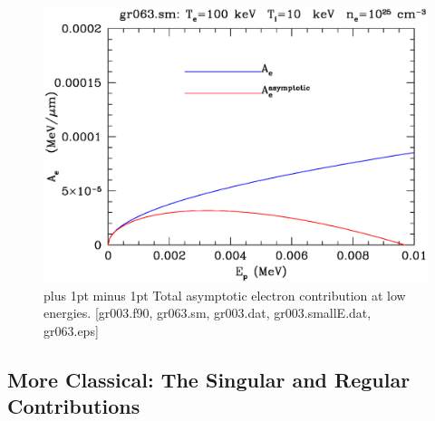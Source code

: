 \documentclass[preprint,12pt,eqsecnum,nofootinbib,amsmath,amssymb]{revtex4}
\newcommand{\footnoteskip}{\baselineskip 12pt plus 1pt minus 1pt}
\begin{document}
\vskip-2cm 
\begin{figure}[h!]
\includegraphics[scale=0.45]{gr063.eps} 
\vskip-0.8cm 
\caption{\footnoteskip  
  Total asymptotic electron contribution at low energies. 
 [gr003.f90, gr063.sm, gr003.dat, gr003.smallE.dat, gr063.eps] 
}
\label{fig:gr063}
\end{figure}

\pagebreak
\subsection{More Classical: The Singular and Regular Contributions}
\end{document}
